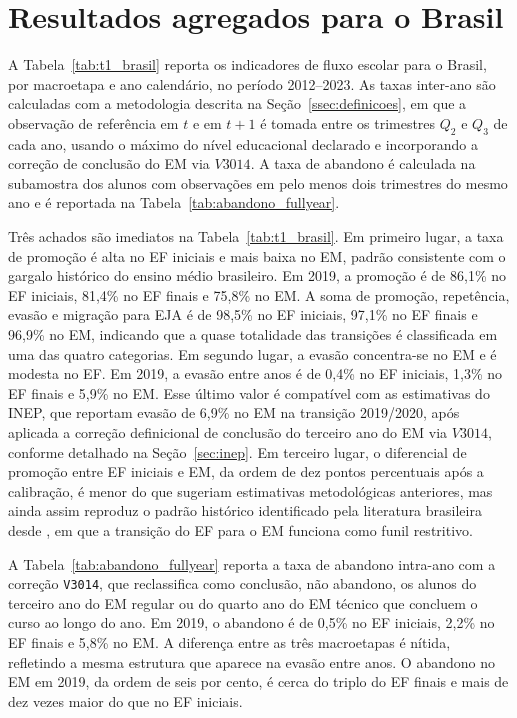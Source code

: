 
\section{Resultados agregados para o Brasil}
\label{sec:agregados}

A Tabela~\ref{tab:t1_brasil} reporta os indicadores de fluxo escolar
para o Brasil, por macroetapa e ano calendário, no período
2012--2023. As taxas inter-ano são calculadas com a metodologia
descrita na Seção~\ref{ssec:definicoes}, em que a observação de
referência em $t$ e em $t+1$ é tomada entre os trimestres $Q_2$ e
$Q_3$ de cada ano, usando o máximo do nível educacional declarado e
incorporando a correção de conclusão do EM via $V3014$. A taxa de
abandono é calculada na subamostra dos alunos com observações em
pelo menos dois trimestres do mesmo ano e é reportada na
Tabela~\ref{tab:abandono_fullyear}.



Três achados são imediatos na Tabela~\ref{tab:t1_brasil}. Em primeiro
lugar, a taxa de promoção é alta no EF iniciais e mais baixa no EM,
padrão consistente com o gargalo histórico do ensino médio
brasileiro. Em 2019, a promoção é de 86,1\% no EF iniciais, 81,4\%
no EF finais e 75,8\% no EM. A soma de promoção, repetência,
evasão e migração para EJA é de 98,5\% no EF iniciais, 97,1\% no
EF finais e 96,9\% no EM, indicando que a quase totalidade das
transições é classificada em uma das quatro categorias. Em segundo
lugar, a evasão concentra-se no EM e é modesta no EF. Em 2019, a
evasão entre anos é de 0,4\% no EF iniciais, 1,3\% no EF finais e
5,9\% no EM. Esse último valor é compatível com as estimativas do
INEP, que reportam evasão de 6,9\% no EM na transição 2019/2020,
após aplicada a correção definicional de conclusão do terceiro
ano do EM via $V3014$, conforme detalhado na
Seção~\ref{sec:inep}. Em terceiro lugar, o diferencial de
promoção entre EF iniciais e EM, da ordem de dez pontos
percentuais após a calibração, é menor do que sugeriam estimativas
metodológicas anteriores, mas ainda assim reproduz o padrão
histórico identificado pela literatura brasileira desde
\citet{Ribeiro1991_pedagogia}, em que a transição do EF para o EM
funciona como funil restritivo.

A Tabela~\ref{tab:abandono_fullyear} reporta a taxa de abandono
intra-ano com a correção \texttt{V3014}, que reclassifica como
conclusão, não abandono, os alunos do terceiro ano do EM regular
ou do quarto ano do EM técnico que concluem o curso ao longo do
ano. Em 2019, o abandono é de 0,5\% no EF iniciais, 2,2\% no EF
finais e 5,8\% no EM. A diferença entre as três macroetapas é
nítida, refletindo a mesma estrutura que aparece na evasão entre
anos. O abandono no EM em 2019, da ordem de seis por cento, é
cerca do triplo do EF finais e mais de dez vezes maior do que no
EF iniciais.

